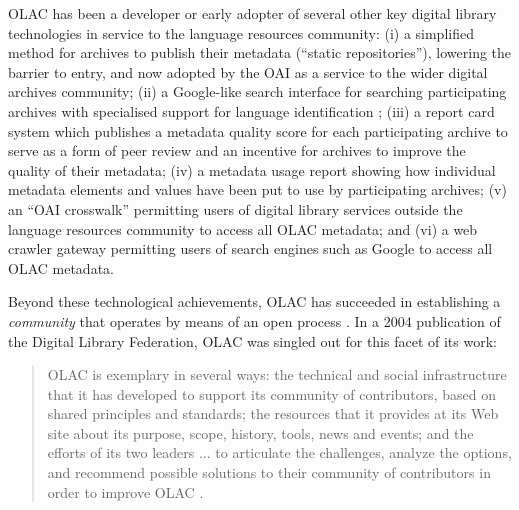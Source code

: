 
OLAC has been a developer or early adopter of several other key
digital library technologies in service to the language resources
community:
(i) a simplified method for archives to publish their metadata
  (``static repositories''), lowering the barrier to entry, and
  now adopted by the OAI as a service to the wider
  digital archives community;
(ii) a Google-like search interface for searching participating
  archives with specialised support for language identification
  \citep{HughesKamat05,Hughes06lrec};
(iii) a report card system which publishes a metadata quality score
  for each participating archive to serve as a form of
  peer review and an incentive for archives to improve the quality of
  their metadata;
(iv) a metadata usage report showing how individual metadata
  elements and values have been put to use by participating archives;
(v) an ``OAI crosswalk'' permitting users of digital library services
  outside the language resources community to access all OLAC metadata;
  and
(vi) a web crawler gateway permitting users of search engines such
  as Google to access all OLAC metadata.

Beyond these technological achievements, OLAC has succeeded in
establishing a \emph{community} that operates by means of an open
process \citep{OLAC-Process}.  In a 2004 publication of the
Digital Library Federation, OLAC was singled out for this
facet of its work:

\begin{quote} \small
  OLAC is exemplary in several ways: the technical and social
  infrastructure that it has developed to support its community of
  contributors, based on shared principles and standards; the
  resources that it provides at its Web site about its purpose, scope,
  history, tools, news and events; and the efforts of its two leaders
  ... to articulate the challenges, analyze the options, and recommend
  possible solutions to their community of contributors in order to
  improve OLAC \citep{Brogan04}.
\end{quote}


